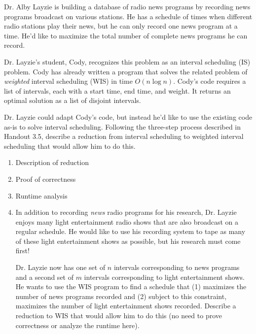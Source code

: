 \documentclass[12 pt, letterpaper]{hmcpset}
\begin{document}
\begin{problem}
	Dr. Alby Layzie is building a database of radio news programs by recording news programs broadcast on various stations. He has a schedule of
times when different radio stations play their news, but he can only record one news program at a time.
He'd like to maximize the total number of complete news programs he can record.

Dr. Layzie's student, Cody, recognizes this problem as an interval scheduling (IS) problem. Cody has already written a program that solves the related problem of \emph{weighted} interval scheduling (WIS) in time $O(n \log n)$. Cody's code requires a list of intervals, each with a start time, end time, and weight. It returns an optimal solution as a list of disjoint intervals.

Dr. Layzie could adapt Cody's code, but  instead he'd like to use the existing code as-is to solve interval scheduling. Following the three-step process described in Handout 3.5, describe a reduction from interval scheduling to weighted interval scheduling that would allow him to do this.

\begin{enumerate}
    \item {Description of reduction}

	\item {Proof of correctness} 

	\item {Runtime analysis}
    
    \item In addition to recording \emph{news} radio programs for his research, Dr. Layzie enjoys many light entertainment radio shows that are also broadcast on a regular schedule. He would like to use his recording system to tape as many of these light entertainment shows as possible, but his research must come first!

    Dr. Layzie now has one set of $n$ intervals corresponding to news programs and a second set of $m$ intervals corresponding to light entertainment shows. He wants to use the WIS program to find a schedule that (1) maximizes the number of news programs recorded and (2) subject to this constraint, maximizes the number of light entertainment shows recorded. Describe a reduction to WIS that would allow him to do this (no need to prove correctness or analyze the runtime here).
\end{enumerate}
\end{problem}
\end{document}
